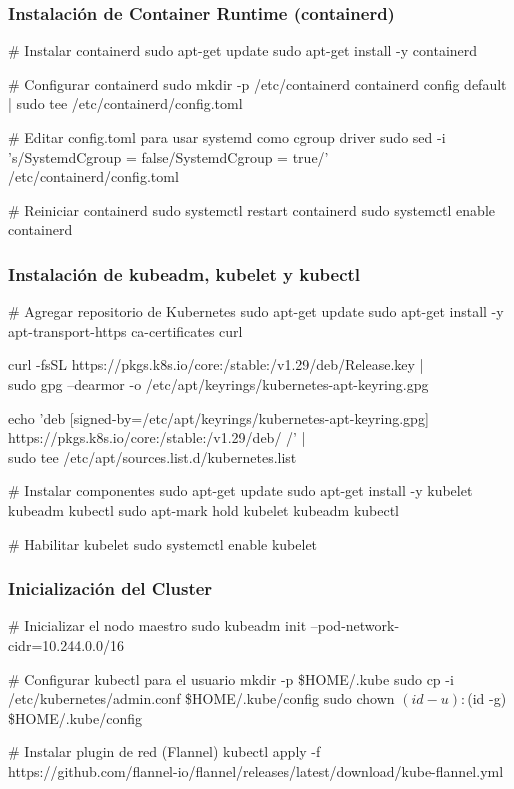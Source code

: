 \documentclass[11pt,a4paper]{article}
\begin{document}
\subsubsection{Instalación de Container Runtime (containerd)}

\begin{commandbox}
\# Instalar containerd
sudo apt-get update
sudo apt-get install -y containerd

\# Configurar containerd
sudo mkdir -p /etc/containerd
containerd config default | sudo tee /etc/containerd/config.toml

\# Editar config.toml para usar systemd como cgroup driver
sudo sed -i 's/SystemdCgroup = false/SystemdCgroup = true/' \\
  /etc/containerd/config.toml

\# Reiniciar containerd
sudo systemctl restart containerd
sudo systemctl enable containerd
\end{commandbox}

\subsubsection{Instalación de kubeadm, kubelet y kubectl}

\begin{commandbox}
\# Agregar repositorio de Kubernetes
sudo apt-get update
sudo apt-get install -y apt-transport-https ca-certificates curl

curl -fsSL https://pkgs.k8s.io/core:/stable:/v1.29/deb/Release.key | \\
  sudo gpg --dearmor -o /etc/apt/keyrings/kubernetes-apt-keyring.gpg

echo 'deb [signed-by=/etc/apt/keyrings/kubernetes-apt-keyring.gpg] \\
  https://pkgs.k8s.io/core:/stable:/v1.29/deb/ /' | \\
  sudo tee /etc/apt/sources.list.d/kubernetes.list

\# Instalar componentes
sudo apt-get update
sudo apt-get install -y kubelet kubeadm kubectl
sudo apt-mark hold kubelet kubeadm kubectl

\# Habilitar kubelet
sudo systemctl enable kubelet
\end{commandbox}

\subsubsection{Inicialización del Cluster}

\begin{commandbox}
\# Inicializar el nodo maestro
sudo kubeadm init --pod-network-cidr=10.244.0.0/16

\# Configurar kubectl para el usuario
mkdir -p \$HOME/.kube
sudo cp -i /etc/kubernetes/admin.conf \$HOME/.kube/config
sudo chown $(id -u):$(id -g) \$HOME/.kube/config

\# Instalar plugin de red (Flannel)
kubectl apply -f \\
  https://github.com/flannel-io/flannel/releases/latest/download/kube-flannel.yml
\end{commandbox}
\end{document}
